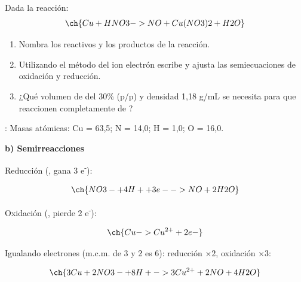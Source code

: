 \begin{exerciseEVAU}
    Dada la reacción:
    \begin{equation*}
        \ch{Cu + HNO3 -> NO + Cu(NO3)2 + H2O}
    \end{equation*}
    \begin{enumerate}[label=\letraminuscula]
        \item Nombra los reactivos y los productos de la reacción. 
        \item Utilizando el método del ion electrón escribe y ajusta las semiecuaciones de oxidación y reducción.
        \item ¿Qué volumen de  del 30\% (p/p) y densidad 1,18 g/mL se necesita para que reaccionen completamente  de ? 
    \end{enumerate}
    \datos{}: Masas atómicas: Cu = 63,5; N = 14,0; H = 1,0; O = 16,0.

    \begin{solu}


        \textbf{b) Semirreacciones}

        Reducción (, gana 3 e\textsuperscript{-}):

        \begin{equation*}
            \ch{NO3- + 4 H+ + 3 e- -> NO + 2 H2O}
        \end{equation*}

        Oxidación (, pierde 2 e\textsuperscript{-}):

        \begin{equation*}
            \ch{Cu -> Cu^{2+} + 2 e-}
        \end{equation*}

        Igualando electrones (m.c.m. de 3 y 2 es 6): reducción \(\times 2\), oxidación \(\times 3\):

        \begin{equation*}
            \ch{3 Cu + 2 NO3- + 8 H+ -> 3 Cu^{2+} + 2 NO + 4 H2O}
        \end{equation*}


\end{solu}
\end{exerciseEVAU}
